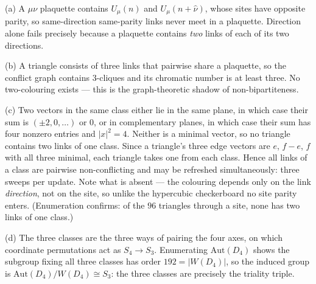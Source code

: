 {(a) A $\mu\nu$ plaquette contains $U_\mu(n)$ and $U_\mu(n+\hat\nu)$, whose
sites have opposite parity, so same-direction same-parity links never meet in a
plaquette. Direction alone fails precisely because a plaquette contains
\emph{two} links of each of its two directions.

(b) A triangle consists of three links that pairwise share a plaquette, so the
conflict graph contains $3$-cliques and its chromatic number is at least three.
No two-colouring exists --- this is the graph-theoretic shadow of
non-bipartiteness.

(c) Two vectors in the same class either lie in the same plane, in which case
their sum is $(\pm2,0,\dots)$ or $0$, or in complementary planes, in which case
their sum has four nonzero entries and $|x|^2=4$. Neither is a minimal vector,
so no triangle contains two links of one class. Since a triangle's three edge
vectors are $e$, $f-e$, $f$ with all three minimal, each triangle takes one from
each class. Hence all links of a class are pairwise non-conflicting and may be
refreshed simultaneously: three sweeps per update. Note what is absent --- the
colouring depends only on the link \emph{direction}, not on the site, so unlike
the hypercubic checkerboard no site parity enters. (Enumeration confirms: of
the $96$ triangles through a site, none has two links of one class.)

(d) The three classes are the three ways of pairing the four axes, on which
coordinate permutations act as $S_4\to S_3$. Enumerating $\mathrm{Aut}(D_4)$
shows the subgroup fixing all three classes has order $192=|W(D_4)|$, so the
induced group is $\mathrm{Aut}(D_4)/W(D_4)\cong S_3$: the three classes are
precisely the triality triple.}

